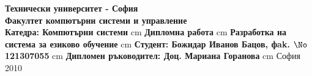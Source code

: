 \begin{titlepage}
\begin{center}
{\large {\bf Технически университет - София\\}}
{\large{\bf Факултет компютърни системи и управление\\}}
{\large{\bf Катедра: Компютърни системи}}
 cm
{\huge {\bf Дипломна работа}}
 cm
{\huge {\bf Разработка на система за езиково обучение}}
 cm
{\large {\bf Студент: Божидар Иванов Бацов, фak. $\No$ 121307055}}
 cm
{\large {\bf Дипломен ръководител: Доц. Мариана Горанова}}
 cm
{\large София 2010}
\end{center}
\end{titlepage}
